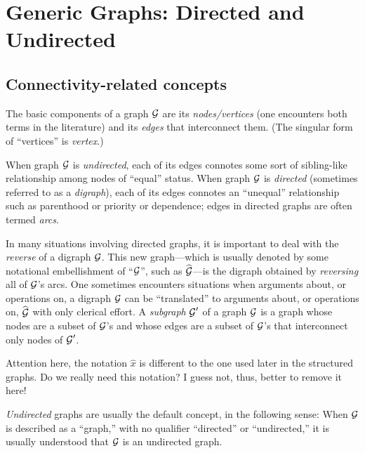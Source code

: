 \section{Generic Graphs: Directed and Undirected}
\label{sec:graphs-generic}
\label{sec:basic-graphs}

\subsection{Connectivity-related concepts}
\label{sec:connectivity-notions}

The basic components of a graph $\mbox{$\cal G$}$ are 
   
its {\em nodes/vertices} (one encounters both terms in the
literature) and its {\em edges} 
 that interconnect them.  (The singular form
of ``vertices'' is {\it vertex}.)   

When graph $\mbox{$\cal G$}$ is {\em undirected},  each of
its edges connotes some sort of sibling-like relationship among nodes
of ``equal'' status.  When graph $\mbox{$\cal G$}$ is {\em directed}
 (sometimes referred to as a {\em digraph}),
  each of its edges connotes an
``unequal'' relationship such as parenthood or priority or dependence;
edges in directed graphs are often termed {\em
  arcs}.  

In many situations involving directed graphs, it is important to
deal with the {\em reverse}  of a digraph $\mbox{$\cal G$}$. 
This new graph---which is usually denoted by some notational
embellishment of ``$\mbox{$\cal G$}$'', such as $\widehat{\mbox{$\cal G$}}$---is the digraph
obtained by {\em reversing} all of $\mbox{$\cal G$}$'s arcs.  One sometimes
encounters situations when arguments about, or operations on, a
digraph $\mbox{$\cal G$}$ can be ``translated'' to arguments about, or operations
on, $\widehat{\mbox{$\cal G$}}$ with only clerical effort.  A {\em subgraph} $\mbox{$\cal G$}'$
of a graph $\mbox{$\cal G$}$ is a graph whose nodes are a subset of $\mbox{$\cal G$}$'s and
whose edges are a subset of $\mbox{$\cal G$}$'s that interconnect only nodes of $\mbox{$\cal G$}'$.  

{\Denis Attention here, the notation $\widehat{x}$ is different to the one used later 
in the structured graphs. Do we really need this notation? I guess not, thus, better to remove it here!}
\medskip

{\em Undirected} graphs are usually the default concept, in the
following sense: When $\mbox{$\cal G$}$ is described as a ``graph,'' with no
qualifier ``directed'' or ``undirected,'' it is usually understood
that $\mbox{$\cal G$}$ is an undirected graph.
\medskip

